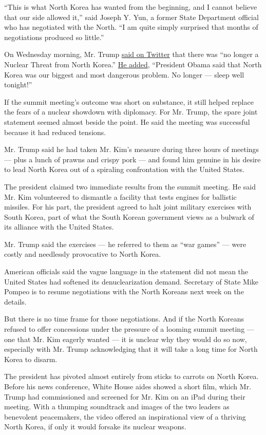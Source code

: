 ``This is what North Korea has wanted from the beginning, and I cannot
believe that our side allowed it,'' said Joseph Y. Yun, a former State
Department official who has negotiated with the North. ``I am quite
simply surprised that months of negotiations produced so little.''

On Wednesday morning, Mr. Trump
\href{https://twitter.com/realDonaldTrump/status/1006837823469735936}{said
on Twitter} that there was ``no longer a Nuclear Threat from North
Korea.''
\href{https://twitter.com/realDonaldTrump/status/1006839007492308992}{He
added}, ``President Obama said that North Korea was our biggest and most
dangerous problem. No longer --- sleep well tonight!''

If the summit meeting's outcome was short on substance, it still helped
replace the fears of a nuclear showdown with diplomacy. For Mr. Trump,
the spare joint statement seemed almost beside the point. He said the
meeting was successful because it had reduced tensions.

Mr. Trump said he had taken Mr. Kim's measure during three hours of
meetings --- plus a lunch of prawns and crispy pork --- and found him
genuine in his desire to lead North Korea out of a spiraling
confrontation with the United States.

The president claimed two immediate results from the summit meeting. He
said Mr. Kim volunteered to dismantle a facility that tests engines for
ballistic missiles. For his part, the president agreed to halt joint
military exercises with South Korea, part of what the South Korean
government views as a bulwark of its alliance with the United States.

Mr. Trump said the exercises --- he referred to them as ``war games''
--- were costly and needlessly provocative to North Korea.

American officials said the vague language in the statement did not mean
the United States had softened its denuclearization demand. Secretary of
State Mike Pompeo is to resume negotiations with the North Koreans next
week on the details.

But there is no time frame for those negotiations. And if the North
Koreans refused to offer concessions under the pressure of a looming
summit meeting --- one that Mr. Kim eagerly wanted --- it is unclear why
they would do so now, especially with Mr. Trump acknowledging that it
will take a long time for North Korea to disarm.

The president has pivoted almost entirely from sticks to carrots on
North Korea. Before his news conference, White House aides showed a
short film, which Mr. Trump had commissioned and screened for Mr. Kim on
an iPad during their meeting. With a thumping soundtrack and images of
the two leaders as benevolent peacemakers, the video offered an
inspirational view of a thriving North Korea, if only it would forsake
its nuclear weapons.

